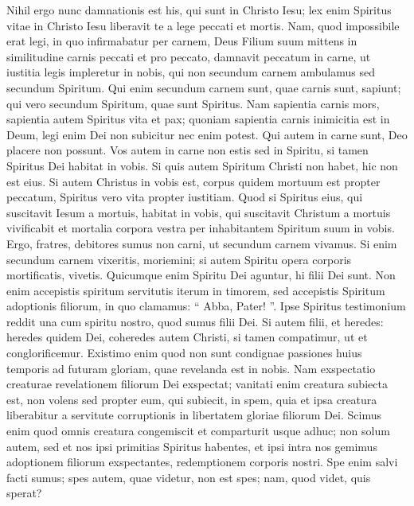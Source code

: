 \begin{biblechapter}
\begin{biblechapter}
\begin{biblechapter}
\begin{biblechapter}
\begin{biblechapter}
\begin{biblechapter}
\begin{biblechapter}
\begin{biblechapter}
\verse Nihil ergo nunc damnationis est his, qui sunt in Christo Iesu; 
\verse lex enim Spiritus vitae in Christo Iesu liberavit te a lege peccati et mortis. 
\verse Nam, quod impossibile erat legi, in quo infirmabatur per carnem, Deus Filium suum mittens in similitudine carnis peccati et pro peccato, damnavit peccatum in carne, 
\verse ut iustitia legis impleretur in nobis, qui non secundum carnem ambulamus sed secundum Spiritum.
 \verse Qui enim secundum carnem sunt, quae carnis sunt, sapiunt; qui vero secundum Spiritum, quae sunt Spiritus. 
\verse Nam sapientia carnis mors, sapientia autem Spiritus vita et pax; 
\verse quoniam sapientia carnis inimicitia est in Deum, legi enim Dei non subicitur nec enim potest. 
\verse Qui autem in carne sunt, Deo placere non possunt.
 \verse Vos autem in carne non estis sed in Spiritu, si tamen Spiritus Dei habitat in vobis. Si quis autem Spiritum Christi non habet, hic non est eius. 
\verse Si autem Christus in vobis est, corpus quidem mortuum est propter peccatum, Spiritus vero vita propter iustitiam. 
\verse Quod si Spiritus eius, qui suscitavit Iesum a mortuis, habitat in vobis, qui suscitavit Christum a mortuis vivificabit et mortalia corpora vestra per inhabitantem Spiritum suum in vobis.
 \verse Ergo, fratres, debitores sumus non carni, ut secundum carnem vivamus. 
\verse Si enim secundum carnem vixeritis, moriemini; si autem Spiritu opera corporis mortificatis, vivetis. 
\verse Quicumque enim Spiritu Dei aguntur, hi filii Dei sunt. 
\verse Non enim accepistis spiritum servitutis iterum in timorem, sed accepistis Spiritum adoptionis filiorum, in quo clamamus: “ Abba, Pater! ”. 
\verse Ipse Spiritus testimonium reddit una cum spiritu nostro, quod sumus filii Dei. 
\verse Si autem filii, et heredes: heredes quidem Dei, coheredes autem Christi, si tamen compatimur, ut et conglorificemur. 
\verse Existimo enim quod non sunt condignae passiones huius temporis ad futuram gloriam, quae revelanda est in nobis.
 \verse Nam exspectatio creaturae revelationem filiorum Dei exspectat; 
\verse vanitati enim creatura subiecta est, non volens sed propter eum, qui subiecit, in spem, 
\verse quia et ipsa creatura liberabitur a servitute corruptionis in libertatem gloriae filiorum Dei. 
\verse Scimus enim quod omnis creatura congemiscit et comparturit usque adhuc; 
\verse non solum autem, sed et nos ipsi primitias Spiritus habentes, et ipsi intra nos gemimus adoptionem filiorum exspectantes, redemptionem corporis nostri. 
\verse Spe enim salvi facti sumus; spes autem, quae videtur, non est spes; nam, quod videt, quis sperat? 

\end{biblechapter}
\end{biblechapter}
\end{biblechapter}
\end{biblechapter}
\end{biblechapter}
\end{biblechapter}
\end{biblechapter}
\end{biblechapter}
